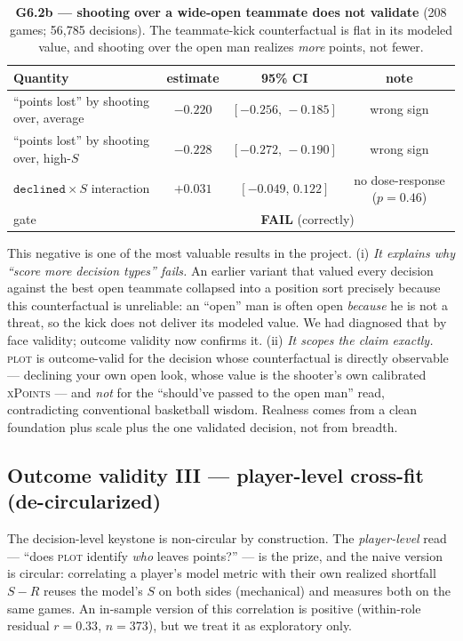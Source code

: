 \documentclass[11pt]{article}
\newcommand{\plot}{\textsc{plot}}
\newcommand{\xpts}{\textsc{xPoints}}
\begin{document}
\begin{table}[t]
\centering
\caption{\textbf{G6.2b --- shooting over a wide-open teammate does not validate} (208 games; 56{,}785
decisions). The teammate-kick counterfactual is flat in its modeled value, and shooting over the open man
realizes \emph{more} points, not fewer.}
\label{tab:asym}
\small
\begin{tabular}{lccc}
\toprule
Quantity & estimate & 95\% CI & note \\
\midrule
``points lost'' by shooting over, average    & $-0.220$ & $[-0.256,\,-0.185]$ & wrong sign \\
``points lost'' by shooting over, high-$S$    & $-0.228$ & $[-0.272,\,-0.190]$ & wrong sign \\
$\texttt{declined}\times S$ interaction       & $+0.031$ & $[-0.049,\,0.122]$  & no dose-response ($p=0.46$) \\
gate                                          & \multicolumn{3}{c}{\textbf{FAIL} (correctly)} \\
\bottomrule
\end{tabular}
\end{table}

This negative is one of the most valuable results in the project. (i) \emph{It explains why ``score more
decision types'' fails.} An earlier variant that valued every decision against the best open teammate
collapsed into a position sort precisely because this counterfactual is unreliable: an ``open'' man is
often open \emph{because} he is not a threat, so the kick does not deliver its modeled value. We had
diagnosed that by face validity; outcome validity now confirms it. (ii) \emph{It scopes the claim
exactly.} \plot{} is outcome-valid for the decision whose counterfactual is directly observable ---
declining your own open look, whose value is the shooter's own calibrated \xpts{} --- and \emph{not} for
the ``should've passed to the open man'' read, contradicting conventional basketball wisdom. Realness comes
from a clean foundation plus scale plus the one validated decision, not from breadth.

\subsection{Outcome validity III --- player-level cross-fit (de-circularized)}\label{sec:g6crossfit}
The decision-level keystone is non-circular by construction. The \emph{player-level} read --- ``does
\plot{} identify \emph{who} leaves points?'' --- is the prize, and the naive version is circular: correlating
a player's model metric with their own realized shortfall $S-R$ reuses the model's $S$ on both sides
(mechanical) and measures both on the same games. An in-sample version of this correlation is positive
(within-role residual $r=0.33$, $n=373$), but we treat it as exploratory only.
\end{document}
